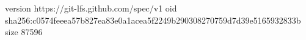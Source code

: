 version https://git-lfs.github.com/spec/v1
oid sha256:c0574feeea57b827ea83e0a1acea5f2249b290308270759d7d39e5165932833b
size 87596
